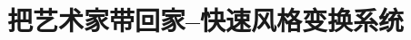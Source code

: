 \documentclass[cs6size,a4paper]{ctexart}
\begin{document}
%

\pagestyle{plain}
\title{把艺术家带回家--快速风格变换系统}
\date{}

\tableofcontents 
\pagestyle{fancy}
%

%
%
%
%
\end{document}
